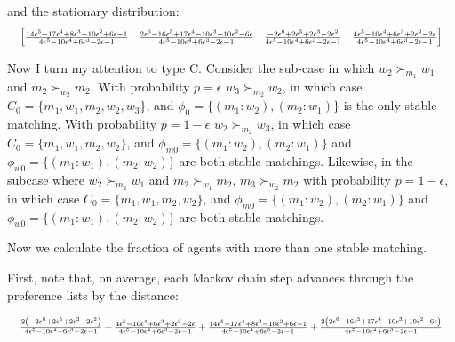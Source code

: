 \documentclass[WP]{AEA}
\begin{document}
and the stationary distribution:
 \begin{equation*}
	\resizebox{\textwidth}{!}{
		$	
		\left[\begin{matrix}\frac{14 \epsilon^{5} - 17 \epsilon^{4} + 8 \epsilon^{3} - 10 \epsilon^{2} + 6 \epsilon - 1}{4 \epsilon^{5} - 10 \epsilon^{4} + 6 \epsilon^{3} - 2 \epsilon - 1} & \frac{2 \epsilon^{6} - 16 \epsilon^{5} + 17 \epsilon^{4} - 10 \epsilon^{3} + 10 \epsilon^{2} - 6 \epsilon}{4 \epsilon^{5} - 10 \epsilon^{4} + 6 \epsilon^{3} - 2 \epsilon - 1} & \frac{- 2 \epsilon^{6} + 2 \epsilon^{5} + 2 \epsilon^{3} - 2 \epsilon^{2}}{4 \epsilon^{5} - 10 \epsilon^{4} + 6 \epsilon^{3} - 2 \epsilon - 1} & \frac{4 \epsilon^{5} - 10 \epsilon^{4} + 6 \epsilon^{3} + 2 \epsilon^{2} - 2 \epsilon}{4 \epsilon^{5} - 10 \epsilon^{4} + 6 \epsilon^{3} - 2 \epsilon - 1}\end{matrix}\right] 
		$
	}
\end{equation*}




Now I turn my attention to type C. Consider the sub-case in which $w_2\succ_{m_1} w_1$ and $m_2\succ_{w_2} m_2$.  With probability $p=\epsilon$ $w_3\succ_{m_2} w_2$, in which case $C_0 =\{m_1,w_1,m_2,w_2, w_3\}$, and $\phi_0=\{(m_1:w_2),(m_2:w_1)\}$ is the only stable matching.  With probability $p=1-\epsilon$ $w_2\succ_{m_2} w_3$, in which case $C_0 =\{m_1,w_1,m_2,w_2\}$, and $\phi_{m0}=\{(m_1:w_2),(m_2:w_1)\}$ and $\phi_{w0}=\{(m_1:w_1),(m_2:w_2)\}$ are both stable matchings.  Likewise, in the subcase where  $w_2\succ_{m_2} w_1$ and $m_2\succ_{w_1} m_2$, $m_3\succ_{w_2} m_2$ with  probability $p=1- \epsilon$, in which case  $C_0 =\{m_1,w_1,m_2,w_2\}$, and $\phi_{m0}=\{(m_1:w_2),(m_2:w_1)\}$ and $\phi_{w0}=\{(m_1:w_1),(m_2:w_2)\}$ are both stable matchings.

Now we calculate the fraction of agents with more than one stable matching.  

First, note that, on average, each Markov chain step advances through the preference lists by the distance:

\begin{equation*}
		\resizebox{\textwidth}{!}{
		$	
			\frac{2 \left(- 2 \epsilon^{6} + 2 \epsilon^{5} + 2 \epsilon^{3} - 2 \epsilon^{2}\right)}{4 \epsilon^{5} - 10 \epsilon^{4} + 6 \epsilon^{3} - 2 \epsilon - 1} + \frac{4 \epsilon^{5} - 10 \epsilon^{4} + 6 \epsilon^{3} + 2 \epsilon^{2} - 2 \epsilon}{4 \epsilon^{5} - 10 \epsilon^{4} + 6 \epsilon^{3} - 2 \epsilon - 1} + \frac{14 \epsilon^{5} - 17 \epsilon^{4} + 8 \epsilon^{3} - 10 \epsilon^{2} + 6 \epsilon - 1}{4 \epsilon^{5} - 10 \epsilon^{4} + 6 \epsilon^{3} - 2 \epsilon - 1} + \frac{2 \left(2 \epsilon^{6} - 16 \epsilon^{5} + 17 \epsilon^{4} - 10 \epsilon^{3} + 10 \epsilon^{2} - 6 \epsilon\right)}{4 \epsilon^{5} - 10 \epsilon^{4} + 6 \epsilon^{3} - 2 \epsilon - 1}
		$
	}
\end{equation*}
\end{document}
